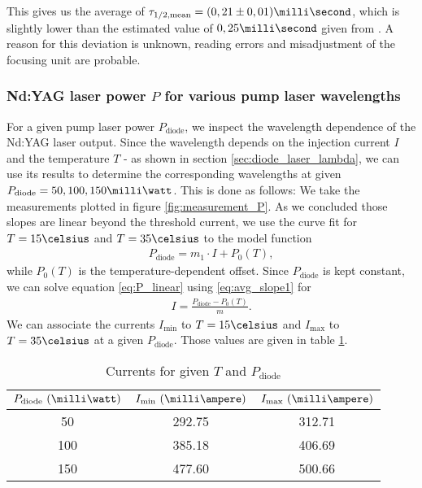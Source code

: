 This gives us the average of $\tau_\text{1/2,mean}=(0,21\pm 0,01)\milli\second$, which is slightly lower than the estimated value of $0,25\milli\second$ given from \cite{lit:manual}. A reason for this deviation is unknown, reading errors and misadjustment of the focusing unit are probable.
\subsubsection{Nd:YAG laser power $P$ for various pump laser wavelengths}
For a given pump laser power $P_\text{diode}$, we inspect the wavelength dependence of the Nd:YAG laser output. Since the wavelength depends on the injection current $I$ and the temperature $T$ - as shown in section \ref{sec:diode_laser_lambda}, we can use its results to determine the corresponding wavelengths at given $P_\text{diode}=50,100,150\milli\watt$.
This is done as follows:
We take the measurements plotted in figure \ref{fig:measurement_P}. As we concluded those slopes are linear beyond the threshold current, we use the curve fit for $T=15\celsius$ and $T=35\celsius$ to the model function
\begin{align}
P_\text{diode}=m_1\cdot I+P_0(T),
\label{eq:P_linear}
\end{align}
while $P_0(T)$ is the temperature-dependent offset. Since $P_\text{diode}$ is kept constant, we can solve equation \eqref{eq:P_linear} using \eqref{eq:avg_slope1} for 
\begin{align}
I=\tfrac{P_\text{diode}-P_0(T)}{m}.
\end{align}
We can associate the currents $I_\text{min}$ to $T=15\celsius$ and $I_\text{max}$ to $T=35\celsius$ at a given $P_\text{diode}$. Those values are given in table \ref{tab:current_P}.

\begin{table}[h]
	\centering
	\caption{Currents for given $T$ and $P_\text{diode}$}
	\begin{tabular}{|c|c c|}
	\hline
	$P_\text{diode}~(\milli\watt)$ & $I_\text{min}~(\milli\ampere)$ & $I_\text{max}~(\milli\ampere)$\\
	\hline
	50 & 292.75 & 312.71\\
	100 & 385.18 & 406.69\\
	150 & 477.60 & 500.66\\
	\hline
	\end{tabular}
	\label{tab:current_P}
\end{table}

